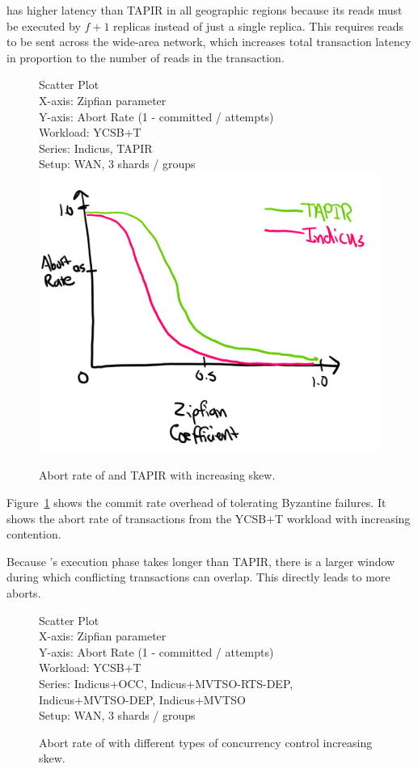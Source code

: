 \sys{} has higher latency than TAPIR in all geographic regions because its
reads must be executed by $f+1$ replicas instead of just a single replica. This
requires reads to be sent across the wide-area network, which increases total
transaction latency in proportion to the number of reads in the transaction.

\begin{figure}
  Scatter Plot\\
  X-axis: Zipfian parameter\\
  Y-axis: Abort Rate (1 - committed / attempts)\\
  Workload: YCSB+T\\
  Series: Indicus, TAPIR\\
  Setup: WAN, 3 shards / groups\\
  \includegraphics[width=\columnwidth]{figures/eval/bft-overhead-aborts.png}
  \caption{Abort rate of \sys{} and TAPIR with increasing skew.}
  \label{fig:bft-overhead-aborts}
\end{figure}

Figure~\ref{fig:bft-overhead-aborts} shows the commit rate overhead of tolerating
Byzantine failures. It shows the abort rate of transactions from the YCSB+T
workload with increasing contention. 

Because \sys{}'s execution phase takes longer than TAPIR, there is a larger
window during which conflicting transactions can overlap. This directly leads
to more aborts.

\begin{figure}
  Scatter Plot\\
  X-axis: Zipfian parameter\\
  Y-axis: Abort Rate (1 - committed / attempts)\\
  Workload: YCSB+T\\
  Series: Indicus+OCC, Indicus+MVTSO-RTS-DEP, Indicus+MVTSO-DEP, Indicus+MVTSO\\
  Setup: WAN, 3 shards / groups\\
  \caption{Abort rate of \sys{} with different types of concurrency control
  increasing skew.}
  \label{fig:cc-aborts}
\end{figure}

